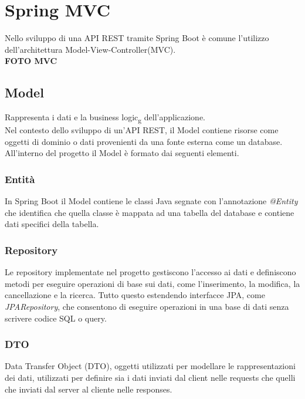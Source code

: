 \section{Spring MVC}
Nello sviluppo di una API REST tramite Spring Boot è comune l'utilizzo dell'architettura Model-View-Controller(MVC).\\

\textbf{FOTO MVC}\\

\subsection{Model}
Rappresenta i dati e la business logic\textsubscript{g} dell'applicazione.\\
Nel contesto dello sviluppo di un'API REST, il Model contiene risorse come oggetti di dominio o dati provenienti da una fonte esterna come un database.\\
All'interno del progetto il Model è formato dai seguenti elementi.
\subsubsection{Entità}
In Spring Boot il Model contiene le classi Java segnate con l'annotazione \textit{@Entity} che identifica che quella classe è mappata ad una tabella del database e contiene dati specifici della tabella.
\subsubsection{Repository}
Le repository implementate nel progetto gestiscono l'accesso ai dati e definiscono metodi per eseguire operazioni di base sui dati, come l'inserimento, la modifica, la cancellazione e la ricerca. Tutto questo estendendo interfacce JPA, come \textit{JPARepository}, che consentono di eseguire operazioni in una base di dati senza scrivere codice SQL o query.
\subsubsection{DTO}
Data Transfer Object (DTO), oggetti utilizzati per modellare le rappresentazioni dei dati, utilizzati per definire sia i dati inviati dal client nelle requests che quelli che inviati dal server al cliente nelle responses.


